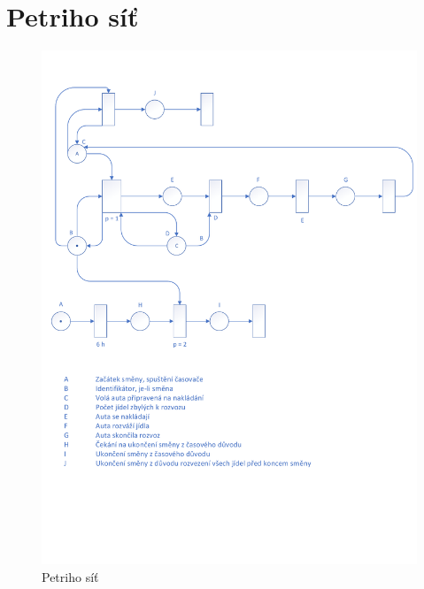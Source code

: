 \documentclass[a4paper, 11pt]{article}
\begin{document}
	\clearpage
	\appendix

	\section{Petriho síť}
	\label{appendix:petri_net}
	\begin{figure}[!ht]
		\centering
		\vspace{-1.2cm}
		\includegraphics[width=0.95\linewidth]{inc/petri_net.pdf}
		\caption{Petriho síť}
		\label{figure:petri_net}
	\end{figure}
\end{document}
